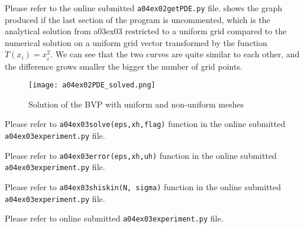 
Please refer to the online submitted \texttt{a04ex02getPDE.py} file.  shows the graph produced if the last section of the program is uncommented, which is the analytical solution from a03ex03 restricted to a uniform grid compared to the numerical solution on a uniform grid vector transformed by the function $T(x_i)=x_i^2$.
We can see that the two curves are quite similar to each other, and the difference grows smaller the bigger the number of grid points. 

\begin{figure}[H]
	\centering
	\texttt{[image: a04ex02PDE\_solved.png]} 
	\caption{Solution of the BVP with uniform and non-uniform meshes}
	\label{fig:a04e02PDE_solve}
\end{figure}

%
%
Please refer to \texttt{a04ex03solve(eps,xh,flag)} function in the online submitted \texttt{a04ex03experiment.py} file.

%
Please refer to \texttt{a04ex03error(eps,xh,uh)} function in the online submitted \texttt{a04ex03experiment.py} file.

%
Please refer to \texttt{a04ex03shiskin(N, sigma)} function in the online submitted \texttt{a04ex03experiment.py} file.

%
Please refer to online submitted \texttt{a04ex03experiment.py} file.

